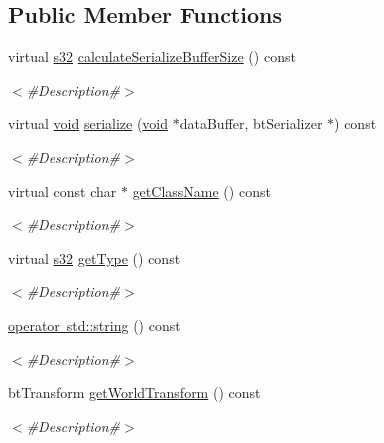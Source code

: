 \subsection*{Public Member Functions}
\begin{DoxyCompactItemize}
\item 
virtual \mbox{\hyperlink{_util_8h_aa62c75d314a0d1f37f79c4b73b2292e2}{s32}} \mbox{\hyperlink{classnjli_1_1_node_a27d0c8349a4c0852fec2dfaa572945ab}{calculate\+Serialize\+Buffer\+Size}} () const
\begin{DoxyCompactList}\small\item\em $<$\#\+Description\#$>$ \end{DoxyCompactList}\item 
virtual \mbox{\hyperlink{_thread_8h_af1e856da2e658414cb2456cb6f7ebc66}{void}} \mbox{\hyperlink{classnjli_1_1_node_a2a5df0b699648161d3a9a4180ea70197}{serialize}} (\mbox{\hyperlink{_thread_8h_af1e856da2e658414cb2456cb6f7ebc66}{void}} $\ast$data\+Buffer, bt\+Serializer $\ast$) const
\begin{DoxyCompactList}\small\item\em $<$\#\+Description\#$>$ \end{DoxyCompactList}\item 
virtual const char $\ast$ \mbox{\hyperlink{classnjli_1_1_node_ad7e048703b244f6c31c8c09be8eadb25}{get\+Class\+Name}} () const
\begin{DoxyCompactList}\small\item\em $<$\#\+Description\#$>$ \end{DoxyCompactList}\item 
virtual \mbox{\hyperlink{_util_8h_aa62c75d314a0d1f37f79c4b73b2292e2}{s32}} \mbox{\hyperlink{classnjli_1_1_node_a8c949ac7cdab8b3251e51162f9a7127d}{get\+Type}} () const
\begin{DoxyCompactList}\small\item\em $<$\#\+Description\#$>$ \end{DoxyCompactList}\item 
\mbox{\hyperlink{classnjli_1_1_node_a4cbf1484792e7d582bb2722325ba0ece}{operator std\+::string}} () const
\begin{DoxyCompactList}\small\item\em $<$\#\+Description\#$>$ \end{DoxyCompactList}\item 
bt\+Transform \mbox{\hyperlink{classnjli_1_1_node_a9db07db4b5fb817d5335d3b31531ffed}{get\+World\+Transform}} () const
\begin{DoxyCompactList}\small\item\em $<$\#\+Description\#$>$ \end{DoxyCompactList}\item 

\end{DoxyCompactItemize}
